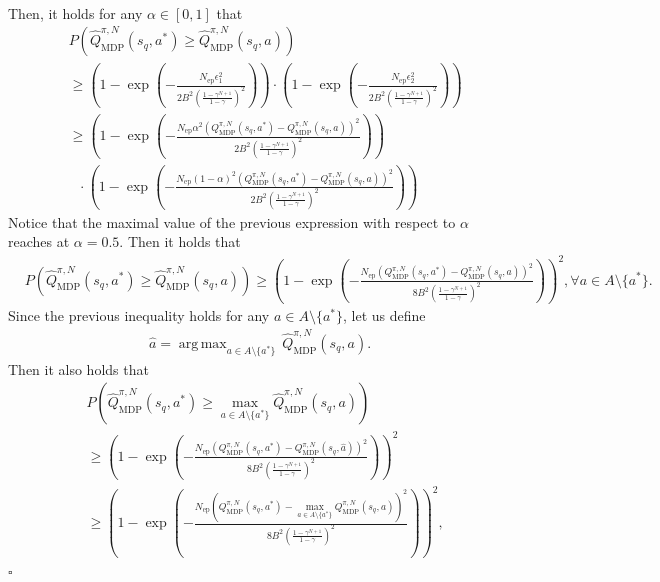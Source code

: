 \documentclass[10pt]{article}
\DeclareMathOperator*{\argmax}{arg\,max}
\newenvironment{myproof}{{\noindent\it Proof. }}{\hfill $\square$ \par}
\begin{document}
\begin{myproof}
\begin{align}
\end{align}
Then, it holds for any $\alpha \in [0, 1]$ that
\begin{align}
    &P \left( \hat{Q}_\text{MDP}^{\pi, N}(s_q, a^*) \geq \hat{Q}_\text{MDP}^{\pi, N}(s_q, a) \right)  \\
    &\geq \left( 1 - \exp \left( - \frac{N_\text{ep} \epsilon_1^2}{2B^2 \left( \frac{1-\gamma^{N+1}}{1-\gamma}\right)^2} \right) \right) \cdot \left( 1 - \exp \left( - \frac{N_\text{ep} \epsilon_2^2}{2B^2 \left( \frac{1-\gamma^{N+1}}{1-\gamma}\right)^2} \right) \right) \\
    &\geq \left( 1 - \exp \left( - \frac{N_\text{ep} \alpha^2 \left( Q_\text{MDP}^{\pi, N}(s_q, a^*) - Q_\text{MDP}^{\pi, N}(s_q, a) \right) ^2}{2B^2 \left( \frac{1-\gamma^{N+1}}{1-\gamma}\right)^2} \right) \right) \\
    &\,\,\,\, \cdot \left( 1 - \exp \left( - \frac{N_\text{ep}  (1-\alpha)^2 \left( Q_\text{MDP}^{\pi, N}(s_q, a^*) - Q_\text{MDP}^{\pi, N}(s_q, a) \right) ^2 }{2B^2 \left( \frac{1-\gamma^{N+1}}{1-\gamma}\right)^2} \right) \right)
\end{align}
Notice that the maximal value of the previous expression with respect to $\alpha$ reaches at $\alpha = 0.5$. Then it holds that
\begin{align}
    &P \left( \hat{Q}_\text{MDP}^{\pi, N}(s_q, a^*) \geq \hat{Q}_\text{MDP}^{\pi, N}(s_q, a) \right) \geq \left( 1 - \exp \left( - \frac{N_\text{ep}  \left( Q_\text{MDP}^{\pi, N}(s_q, a^*) - Q_\text{MDP}^{\pi, N}(s_q, a) \right) ^2}{8B^2 \left( \frac{1-\gamma^{N+1}}{1-\gamma}\right)^2} \right) \right)^2, \forall a \in A \setminus \{a^*\}.
\end{align}
Since the previous inequality holds for any $a \in A \setminus \{a^*\}$, let us define
\begin{align}
    \hat{a} = \argmax_{a \in A \setminus \{a^*\}} \, \hat{Q}_\text{MDP}^{\pi, N}(s_q, a).
\end{align}
Then it also holds that
\begin{align}
    &P \left( \hat{Q}_\text{MDP}^{\pi, N}(s_q, a^*) \geq \max_{a \in A \setminus \{a^*\}} \hat{Q}_\text{MDP}^{\pi, N}(s_q, a) \right) \nonumber \\
    &\geq \left( 1 - \exp \left( - \frac{N_\text{ep}  \left( Q_\text{MDP}^{\pi, N}(s_q, a^*) - Q_\text{MDP}^{\pi, N}(s_q, \hat{a}) \right) ^2}{8B^2 \left( \frac{1-\gamma^{N+1}}{1-\gamma}\right)^2} \right) \right)^2 \\
    &\geq \left( 1 - \exp \left( - \frac{N_\text{ep}  \left( Q_\text{MDP}^{\pi, N}(s_q, a^*) - \max_{a \in A \setminus \{a^*\}}  Q_\text{MDP}^{\pi, N}(s_q, a) \right) ^2}{8B^2 \left( \frac{1-\gamma^{N+1}}{1-\gamma}\right)^2} \right) \right)^2, \label{eqn_temp_prob1}

\end{align}
\end{myproof}
\end{document}
